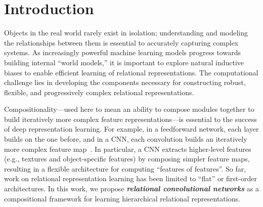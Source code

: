 \section{Introduction}\label{sec:intro}

Objects in the real world rarely exist in isolation; understanding and modeling the relationships between them is essential to accurately capturing complex systems. As increasingly powerful machine learning models progress towards building internal ``world models,'' it is important to explore natural inductive biases to enable efficient learning of relational representations. The computational challenge lies in developing the components necessary for constructing robust, flexible, and progressively complex relational representations.

Compositionality---used here to mean an ability to compose modules together to build iteratively more complex feature representations---is essential to the success of deep representation learning. For example, in a feedforward network, each layer builds on the one before, and in a CNN, each convolution builds an iteratively more complex feature map~\citep{zeiler2014visualizing}. In particular, a CNN extracts higher-level features (e.g., textures and object-specific features) by composing simpler feature maps, resulting in a flexible architecture for computing ``features of features''. So far, work on relational representation learning has been limited to ``flat'' or first-order architectures. In this work, we propose \textit{\bfseries relational convolutional networks} as a compositional framework for learning hierarchical relational representations.

